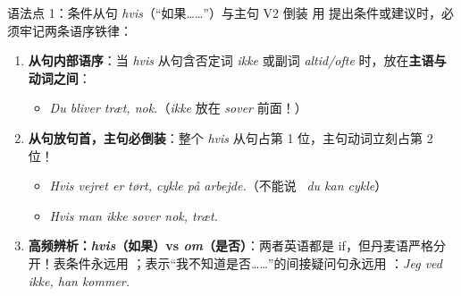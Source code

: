 
\begin{grammatikbox}{语法点 1：条件从句 \textit{hvis}（“如果……”）与主句 V2 倒装}
用  提出条件或建议时，必须牢记两条语序铁律：
\begin{enumerate}
  \item \textbf{从句内部语序}：当 \textit{hvis} 从句含否定词 \textit{ikke} 或副词 \textit{altid/ofte} 时，放在\textbf{主语与动词之间}：
    \begin{itemize}
      \item \textit{Du bliver træt,  nok.}（\textit{ikke} 放在 \textit{sover} 前面！）
    \end{itemize}
  \item \textbf{从句放句首，主句必倒装}：整个 \textit{hvis} 从句占第 1 位，主句动词立刻占第 2 位！
    \begin{itemize}
      \item \textit{Hvis vejret er tørt,  cykle på arbejde.}（不能说 \ \textit{du kan cykle}）
      \item \textit{Hvis man ikke sover nok,  træt.}
    \end{itemize}
  \item \textbf{高频辨析：\textit{hvis}（如果）vs \textit{om}（是否）}：两者英语都是 if，但丹麦语严格分开！表条件永远用 ；表示“我不知道是否……”的间接疑问句永远用 ：\textit{Jeg ved ikke,  han kommer.}
\end{enumerate}
\end{grammatikbox}

